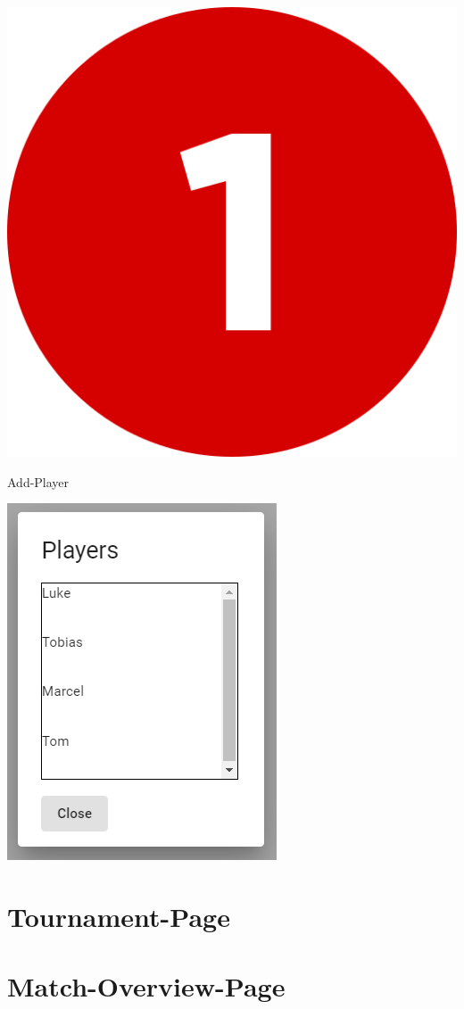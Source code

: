 \bigskip
\includegraphics[scale=0.05]{pics/user-guide/numbers/number-1.png} \begin{LARGE} Add-Player \end{LARGE}

\includegraphics[scale=0.5]{pics/user-guide/add-player.PNG}
\section{Tournament-Page}
\section{Match-Overview-Page} 